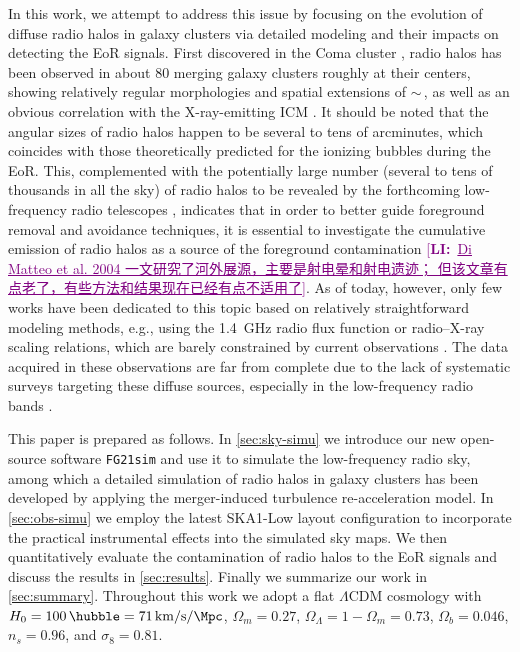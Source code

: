 \documentclass[modern]{aastex62}
\newcommand{\lcdm}{$\Lambda$CDM}
\newcommand{\LI}[1]{\textcolor{purple}{[\textbf{LI:}~\uline{#1}]}}
\begin{document}
In this work, we attempt to address this issue by focusing on the
evolution of diffuse radio halos in galaxy clusters via detailed
modeling and their impacts on detecting the EoR signals.
First discovered in the Coma cluster \citep{large1959}, radio halos
has been observed in about 80 merging galaxy clusters roughly at
their centers, showing relatively regular morphologies and spatial
extensions of $\sim\,$\si{\Mpc}, as well as an obvious correlation
with the X-ray-emitting ICM \citep[e.g.,][]{cassano2013}.
It should be noted that the angular sizes of radio halos happen to be
several to tens of arcminutes, which coincides with those theoretically
predicted for the ionizing bubbles during the EoR.
This, complemented with the potentially large number
{\color{magenta}(several to tens of thousands in all the sky)}
of radio halos to be revealed by the forthcoming
low-frequency radio telescopes \citep[e.g.,][]{cassano2015},
indicates that in order to better guide foreground removal and avoidance
techniques, it is essential to investigate the cumulative emission
of radio halos as a source of the foreground contamination
\citep[e.g.,][]{diMatteo2004,gleser2008}
\LI{Di Matteo et al. 2004 一文研究了河外展源，主要是射电晕和射电遗迹；
但该文章有点老了，有些方法和结果现在已经有点不适用了}.
As of today, however, only few works have been dedicated to this topic
based on relatively straightforward modeling methods,
{\color{magenta}
e.g., using the \SI{1.4}{\GHz} radio flux function or radio--X-ray
scaling relations, which are barely constrained by current observations
\citep[e.g.,][]{gleser2008,jelic2008}.
}
The data acquired in these observations are far from complete due to
the lack of systematic surveys targeting these diffuse sources,
especially in the low-frequency radio bands \citep[e.g.,][]{kale2016rev}.

This paper is prepared as follows.
In \autoref{sec:sky-simu} we introduce our new open-source software
\texttt{FG21sim} and use it to simulate the low-frequency radio sky,
among which a detailed simulation of radio halos in galaxy clusters has
been developed by applying the merger-induced turbulence re-acceleration
model.
In \autoref{sec:obs-simu} we employ the latest SKA1-Low layout
configuration to incorporate the practical instrumental effects into
the simulated sky maps.
We then quantitatively evaluate the contamination of radio halos to the
EoR signals and discuss the results in \autoref{sec:results}.
Finally we summarize our work in \autoref{sec:summary}.
Throughout this work we adopt a flat \lcdm{} cosmology with
$H_0 = \SI{100}{\hubble} = \SI{71}{\km\per\second\per\Mpc}$,
$\Omega_m = 0.27$, $\Omega_{\Lambda} = 1 - \Omega_m = 0.73$,
$\Omega_b = 0.046$, $n_s = 0.96$, and $\sigma_8 = 0.81$.
\end{document}
